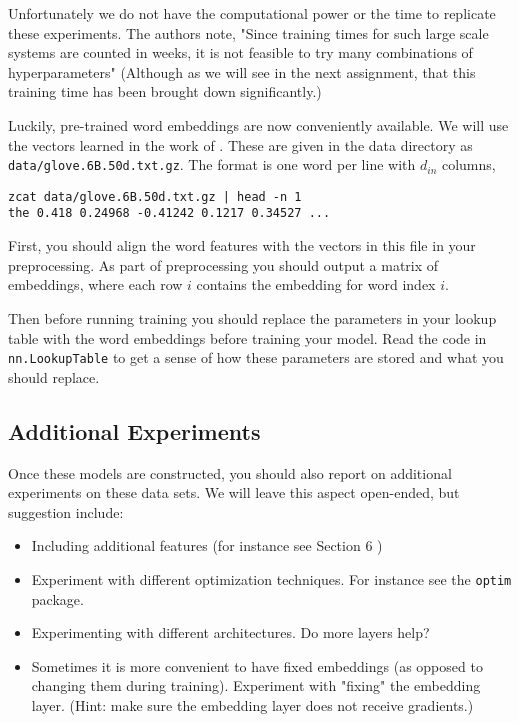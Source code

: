 \documentclass[11pt]{article}
\begin{document}
Unfortunately we do not have the computational power or the time to
replicate these experiments. The authors note, "Since training times
for such large scale systems are counted in weeks, it is not feasible
to try many combinations of hyperparameters" (Although as we will see
in the next assignment, that this training time has been brought down
significantly.)
 
Luckily, pre-trained word embeddings are now conveniently
available. We will use the vectors learned in the work of
\citet{DBLP:conf/emnlp/PenningtonSM14}. These are given in the 
data directory as \texttt{data/glove.6B.50d.txt.gz}. The format 
is one word per line with $d_{in}$ columns,   

\begin{verbatim}
zcat data/glove.6B.50d.txt.gz | head -n 1
the 0.418 0.24968 -0.41242 0.1217 0.34527 ...
\end{verbatim}

First, you should align the word
features with the vectors in this file in your preprocessing. 
As part of preprocessing you should output a matrix of
embeddings, where each row $i$ contains the embedding for 
word index $i$.

Then before running training you should replace the parameters in your
lookup table with the word embeddings before training your model. Read
the code in \texttt{nn.LookupTable} to get a sense of how these
parameters are stored and what you should replace.

\subsection{Additional Experiments}

Once these models are constructed, you should also report on
additional experiments on these data sets. We will leave this aspect
open-ended, but suggestion include:

\begin{itemize}
\item Including additional features (for instance see Section 6 \citep{collobert2011natural})
\item Experiment with different optimization techniques. For instance see the \texttt{optim} package. 
\item Experimenting with different architectures. Do more layers help? 
\item Sometimes it is more convenient to have fixed embeddings (as opposed to changing them during training). Experiment with "fixing" the embedding layer. (Hint: make sure the embedding layer does not receive gradients.)
\end{itemize}
\end{document}
